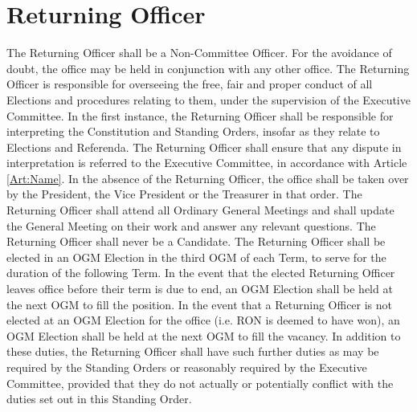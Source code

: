 \section{Returning Officer} \label{sec:RO}
\npara The Returning Officer shall be a Non-Committee Officer.  For the avoidance of doubt, the office may be held in conjunction with any other office.
\npara The Returning Officer is responsible for overseeing the free, fair and proper conduct of all Elections and procedures relating to them, under the supervision of the Executive Committee.
\npara In the first instance, the Returning Officer shall be responsible for interpreting the Constitution and Standing Orders, insofar as they relate to Elections and Referenda.  The Returning Officer shall ensure that any dispute in interpretation is referred to the Executive Committee, in accordance with Article \ref{Art:Name}.
\npara In the absence of the Returning Officer, the office shall be taken over by the President, the Vice President or the Treasurer in that order.
\npara The Returning Officer shall attend all Ordinary General Meetings and shall update the General Meeting on their work and answer any relevant questions.
\npara \label{SO:ROCandidacy} The Returning Officer shall never be a Candidate.
\npara The Returning Officer shall be elected in an OGM Election in the third OGM of each Term, to serve for the duration of the following Term.
\npara In the event that the elected Returning Officer leaves office before their term is due to end, an OGM Election shall be held at the next OGM to fill the position.
\npara In the event that a Returning Officer is not elected at an OGM Election for the office (i.e. RON is deemed to have won), an OGM Election shall be held at the next OGM to fill the vacancy.
\npara In addition to these duties, the Returning Officer shall have such further duties as may be required by the Standing Orders or reasonably required by the Executive Committee, provided that they do not actually or potentially conflict with the duties set out in this Standing Order.
